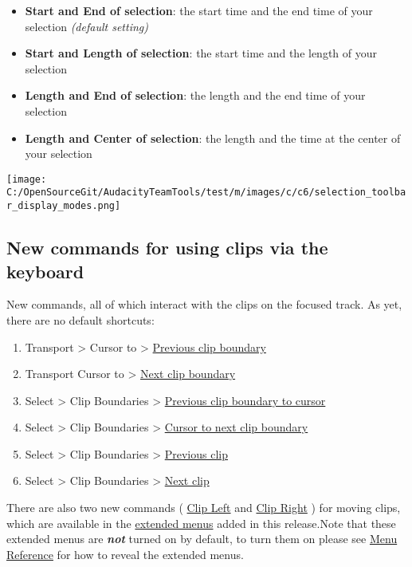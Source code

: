 \begin{multicols}{2}
\begin{itemize}
\item \textbf{Start and End of selection}: the start time and the end time of your selection \textit{(default setting)}
\item \textbf{Start and Length of selection}: the start time and the length of your selection
\item \textbf{Length and End of selection}: the length and the end time of your selection
\item \textbf{Length and Center of selection}: the length and the time at the center of your selection
\end{itemize}
\par \protect\texttt{[image: C:/OpenSourceGit/AudacityTeamTools/test/m/images/c/c6/selection\_toolbar\_display\_modes.png]}\par 
\label{newXfeaturesXinXthisXreleaseXclips}
\subsection{New commands for using clips via the keyboard}New commands, all of which interact with the clips on the focused track. As yet, there are no default shortcuts:

\begin{enumerate}
\item Transport > Cursor to > 
\hyperref[\foo{transportXmenuXcursorXtoXpreviousXclipXboundary}]{Previous clip boundary}

\item Transport Cursor to > 
\hyperref[\foo{transportXmenuXcursorXtoXnextXclipXboundary}]{Next clip boundary}

\item Select > Clip Boundaries > 
\hyperref[\foo{selectXmenuXclipXboundariesXpreviousXclipXboundaryXtoXcursor}]{Previous clip boundary to cursor}

\item Select > Clip Boundaries > 
\hyperref[\foo{selectXmenuXclipXboundariesXcursorXtoXnextXclipXboundary}]{Cursor to next clip boundary}

\item Select > Clip Boundaries > 
\hyperref[\foo{selectXmenuXclipXboundariesXpreviousXclip}]{Previous clip}

\item Select > Clip Boundaries > 
\hyperref[\foo{selectXmenuXclipXboundariesXnextXclip}]{Next clip}

\end{enumerate}
There are also two new commands (
\hyperref[\foo{extXcommandXmenuXcursorXclipXleft}]{Clip Left}
 and 
\hyperref[\foo{extXcommandXmenuXcursorXclipXright}]{Clip Right}
) for moving clips, which are available in the 
\hyperref[\foo{newXfeaturesXinXthisXreleaseXXextendedmenubar}]{extended menus}
 added in this release.Note that these extended menus are \textit{\textbf{not}} turned on by default, to turn them on please see 
\hyperref[\foo{menuXreferenceXtheXextendedXmenuXbar}]{Menu Reference}
 for how to reveal the extended menus.
\label{newXfeaturesXinXthisXreleaseXsafety}

\end{multicols}
